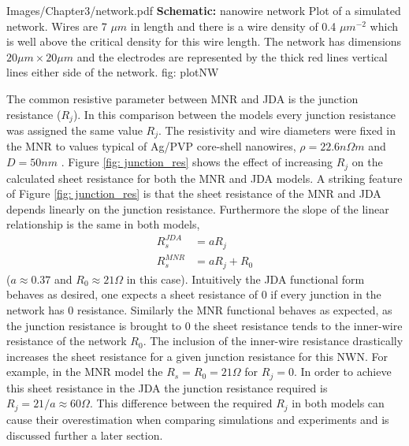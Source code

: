 {Images/Chapter3/network.pdf}
{\textbf{Schematic:} nanowire network}
{Plot of a simulated network. Wires are 7 $\mu m$ in length and there is a wire density of 0.4 $\mu m^{-2}$ which is well above the critical density for this wire length. The network has dimensions $20 \mu m \times 20 \mu m$ and the electrodes are represented by the thick red lines vertical lines either side of the network.}
{fig: plotNW}

The common resistive parameter between MNR and JDA is the junction resistance ($R_j$). In this comparison between the models every junction resistance was assigned the same value $R_j$. The resistivity and wire diameters were fixed in the MNR to values typical of Ag/PVP core-shell nanowires, $\rho = 22.6 n \Omega m$ and $D = 50 nm$ \cite{rocha2015}. Figure \ref{fig: junction_res} shows the effect of increasing $R_j$ on the calculated sheet resistance for both the MNR and JDA models. A striking feature of Figure \ref{fig: junction_res} is that the sheet resistance of the MNR and JDA depends linearly on the junction resistance. Furthermore the slope of the linear relationship is the same in both models, 
\begin{align}
R_s^{JDA} &= a R_j  \label{eq: Rs_jda}\\
R_s^{MNR} &= a R_j + R_0 \label{eq: Rs_mnr}
\end{align}
($a \approx 0.37$ and $R_0 \approx 21 \Omega$ in this case). Intuitively the JDA functional form behaves as desired, one expects a sheet resistance of 0 if every junction in the network has 0 resistance. Similarly the MNR functional behaves as expected, as the junction resistance is brought to 0 the sheet resistance tends to the inner-wire resistance of the network $R_0$. The inclusion of the inner-wire resistance drastically increases the sheet resistance for a given junction resistance for this NWN. For example, in the MNR model the $R_s = R_0 = 21\Omega$ for $R_j = 0$. In order to achieve this sheet resistance in the JDA the junction resistance required is $R_j = 21/a \approx 60 \Omega$. This difference between the required $R_j$ in both models can cause their overestimation when comparing simulations and experiments and is discussed further a later section.

